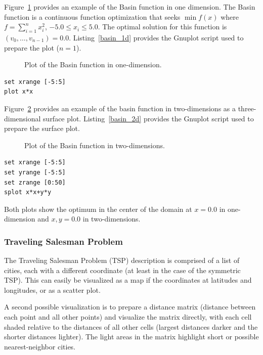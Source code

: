 Figure~\ref{plot:basin1} provides an example of the Basin function in one dimension. The Basin function is a  continuous function optimization that seeks $\min f(x)$ where $f=\sum_{i=1}^n x_{i}^2$, $-5.0\leq x_i \leq 5.0$. The optimal solution for this function is $(v_0,\ldots,v_{n-1})=0.0$. Listing~\ref{basin_1d} provides the Gnuplot script used to prepare the plot ($n=1$).

\begin{figure}[htp]
\centering

\caption{Plot of the Basin function in one-dimension.}
\label{plot:basin1}
\end{figure}

\begin{lstlisting}[caption=Gnuplot script for plotting a function in one-dimension., label=basin_1d]
set xrange [-5:5]
plot x*x
\end{lstlisting}

Figure~\ref{plot:basin2} provides an example of the basin function in two-dimensions as a three-dimensional surface plot. Listing~\ref{basin_2d} provides the Gnuplot script used to prepare the surface plot.

\begin{figure}[htp]
\centering

\caption{Plot of the Basin function in two-dimensions.}
\label{plot:basin2}
\end{figure}

\begin{lstlisting}[caption=Gnuplot script for plotting a function in two-dimensions, label=basin_2d]
set xrange [-5:5]
set yrange [-5:5]
set zrange [0:50]
splot x*x+y*y
\end{lstlisting}

Both plots show the optimum in the center of the domain at $x=0.0$ in one-dimension and $x,y=0.0$ in two-dimensions.

\subsubsection{Traveling Salesman Problem}
The Traveling Salesman Problem (TSP) description is comprised of a list of cities, each with a different coordinate (at least in the case of the symmetric TSP). This can easily be visualized as a map if the coordinates at latitudes and longitudes, or as a scatter plot.

A second possible visualization is to prepare a distance matrix (distance between each point and all other points) and visualize the matrix directly, with each cell shaded relative to the distances of all other cells (largest distances darker and the shorter distances lighter). The light areas in the matrix highlight short or possible nearest-neighbor cities.

